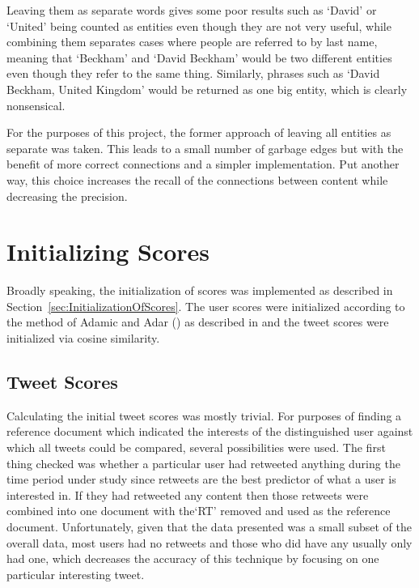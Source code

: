 Leaving them as separate words gives some poor results such as `David' or `United' being counted as entities even though they are not very useful, while combining them separates cases where people are referred to by last name, meaning that `Beckham' and `David Beckham' would be two different entities even though they refer to the same thing. Similarly, phrases such as `David Beckham, United Kingdom' would be returned as one big entity, which is clearly nonsensical.

For the purposes of this project, the former approach of leaving all entities as separate was taken. This leads to a small number of garbage edges but with the benefit of more correct connections and a simpler implementation. Put another way, this choice increases the recall of the connections between content while decreasing the precision.


\section{Initializing Scores}
\label{sec:InitializingScores}

Broadly speaking, the initialization of scores was implemented as described in Section~\ref{sec:InitializationOfScores}. The user scores were initialized according to the method of Adamic and Adar (\cite{Adamic2003}) as described in \cite{LibenNowell2007} and the tweet scores were initialized via cosine similarity.

\subsection{Tweet Scores}

Calculating the initial tweet scores was mostly trivial. For purposes of finding a reference document which indicated the interests of the distinguished user against which all tweets could be compared, several possibilities were used. The first thing checked was whether a particular user had retweeted anything during the time period under study since retweets are the best predictor of what a user is interested in. If they had retweeted any content then those retweets were combined into one document with the`RT' removed and used as the reference document. Unfortunately, given that the data presented was a small subset of the overall data, most users had no retweets and those who did have any usually only had one, which decreases the accuracy of this technique by focusing on one particular interesting tweet.

